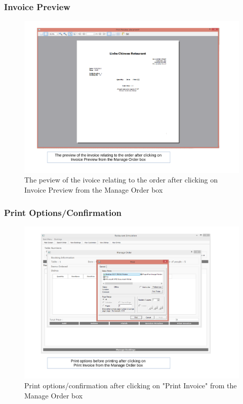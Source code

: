 \begin{landscape}
\subsubsection{Invoice Preview}
\begin{figure}[H]
    \includegraphics[width = 15cm]{./Maintenance/images/screen13}
    \caption{The peview of the ivoice relating to the order after clicking on Invoice Preview from the Manage Order box} \label{fig:screen13}
\end{figure}

\subsubsection{Print Options/Confirmation}
\begin{figure}[H]
    \includegraphics[width = 15cm]{./Maintenance/images/screen14}
    \caption{Print options/confirmation after clicking on "Print Invoice" from the Manage Order box} \label{fig:screen14}
\end{figure}


\end{landscape}
